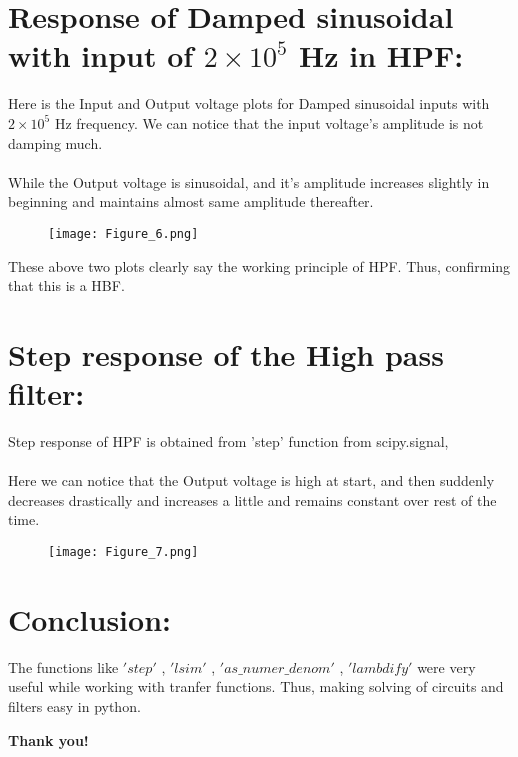\documentclass[12pt]{article}
\begin{document}
\newpage
\section*{Response of Damped sinusoidal with input of $2 \times 10^{5}$ Hz in HPF:}

Here is the Input and Output voltage plots for Damped sinusoidal inputs with $2 \times 10^{5}$ Hz frequency. We can notice that the input voltage's amplitude is not damping much.\\
\\While the Output voltage is sinusoidal, and it's amplitude increases slightly in beginning and maintains almost same amplitude thereafter.

\begin{figure}[h!]
\centering
\texttt{[image: Figure\_6.png]}
\label{fig:exemplo}
\end{figure}

These above two plots clearly say the working principle of HPF. Thus, confirming that this is a HBF.

\newpage
\section*{Step response of the High pass filter:}

Step response of HPF is obtained from 'step' function from scipy.signal,\\\\
Here we can notice that the Output voltage is high at start, and then suddenly decreases drastically and increases a little and remains constant over rest of the time.

\begin{figure}[h!]
\centering
\texttt{[image: Figure\_7.png]}
\label{fig:exemplo}
\end{figure}

\section*{\textbf{Conclusion:}}
The functions like $'step'$ , $'lsim'$ , $'as\_numer\_denom'$ , $'lambdify'$ were very useful while working with tranfer functions. Thus, making solving of circuits and filters easy in python.

\begin{center} 
\textbf{Thank you!}
\end{center} 
\end{document}
